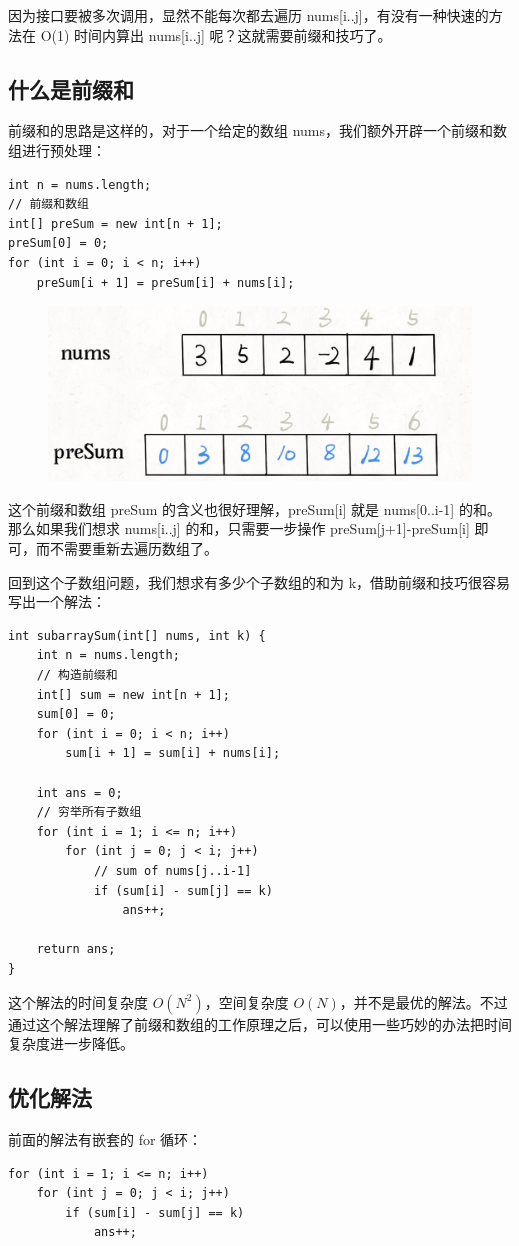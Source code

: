 \documentclass[12pt]{article}
\begin{document}
因为接口要被多次调用，显然不能每次都去遍历 nums[i..j]，有没有一种快速的方法在 O(1) 时间内算出 nums[i..j] 呢？这就需要前缀和技巧了。

\subsection{什么是前缀和}
前缀和的思路是这样的，对于一个给定的数组 nums，我们额外开辟一个前缀和数组进行预处理：
\begin{lstlisting}
int n = nums.length;
// 前缀和数组
int[] preSum = new int[n + 1];
preSum[0] = 0;
for (int i = 0; i < n; i++)
    preSum[i + 1] = preSum[i] + nums[i];
\end{lstlisting}
\begin{figure}[H]
    \centering
    \includegraphics[width=.4\textwidth]{fig/Prefix_Tricks_2.png}
\end{figure}

这个前缀和数组 preSum 的含义也很好理解，preSum[i] 就是 nums[0..i-1] 的和。那么如果我们想求 nums[i..j] 的和，只需要一步操作 preSum[j+1]-preSum[i] 即可，而不需要重新去遍历数组了。

回到这个子数组问题，我们想求有多少个子数组的和为 k，借助前缀和技巧很容易写出一个解法：
\begin{lstlisting}
int subarraySum(int[] nums, int k) {
    int n = nums.length;
    // 构造前缀和
    int[] sum = new int[n + 1];
    sum[0] = 0; 
    for (int i = 0; i < n; i++)
        sum[i + 1] = sum[i] + nums[i];
    
    int ans = 0;
    // 穷举所有子数组
    for (int i = 1; i <= n; i++)
        for (int j = 0; j < i; j++)
            // sum of nums[j..i-1]
            if (sum[i] - sum[j] == k)
                ans++;

    return ans;
}
\end{lstlisting}

这个解法的时间复杂度 $O(N^2)$，空间复杂度 $O(N)$，并不是最优的解法。不过通过这个解法理解了前缀和数组的工作原理之后，可以使用一些巧妙的办法把时间复杂度进一步降低。

\subsection{优化解法}
前面的解法有嵌套的 for 循环：
\begin{lstlisting}
for (int i = 1; i <= n; i++)
    for (int j = 0; j < i; j++)
        if (sum[i] - sum[j] == k)
            ans++;
\end{lstlisting}
\end{document}
